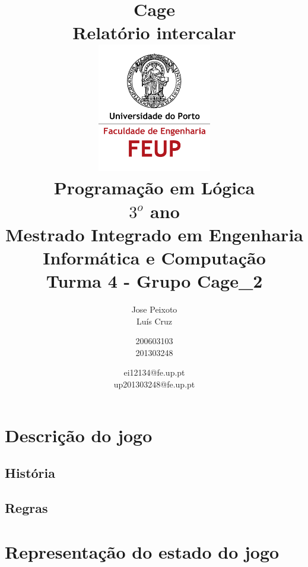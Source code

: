 \documentclass[a4paper,11pt]{article}
\begin{document}
\begin{titlepage}
\title{\huge \textbf{Cage\\[1cm] \Large Relatório intercalar\\[1cm]
\includegraphics[width=50mm,scale=0.5]{logo.png}\\[1cm] \large Programação em
Lógica\\[0.25cm] \small $3^o$ ano\\[0.05cm]Mestrado Integrado em Engenharia Informática e
Computação\\[1.7cm]}\normalsize Turma 4 - Grupo Cage\_2}
\author{Jose Peixoto \\Luís Cruz \and 200603103\\201303248 \and ei12134@fe.up.pt
\\ up201303248@fe.up.pt\\[1cm]}
\maketitle
\pagestyle{empty} %
\end{titlepage}

\section{Descrição do jogo}
\subsection{História}
\subsection{Regras}

\section{Representação do estado do jogo}

\end{document}
